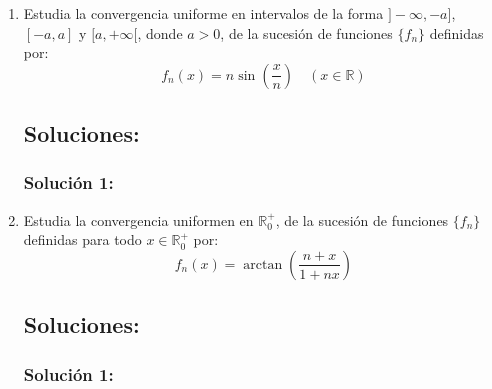 \documentclass[a4paper, 11pt]{article} %
\begin{document}
\begin{enumerate}
	\item Estudia la convergencia uniforme en intervalos de la forma $]-\infty, -a]$, $[-a,a]$ y
	$[a, +\infty[$, donde $a > 0$, de la sucesión de funciones $\{f_n\}$ definidas por:
	$$f_n(x) = n \sin\left(\frac{x}{n}\right) \quad (x \in \mathbb{R})$$
	\subsection*{Soluciones:}
		\subsubsection*{Solución 1:}
	
	\item Estudia la convergencia uniformen en $\mathbb{R}^+_0$, de la sucesión de funciones $\{f_n\}$
	definidas para todo $x \in \mathbb{R}^+_0$ por:
	$$f_n(x) = \arctan\left(\frac{n+x}{1+nx}\right)$$
	\subsection*{Soluciones:}
		\subsubsection*{Solución 1:}
\end{enumerate}
\end{document}
